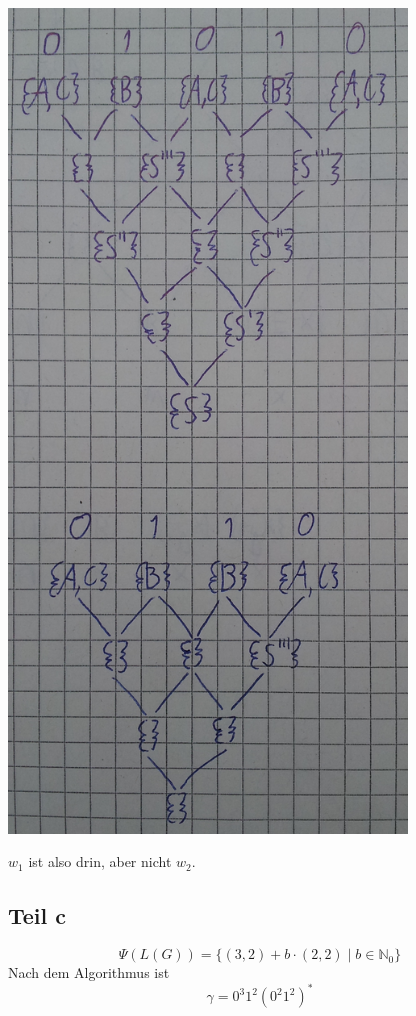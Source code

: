 \documentclass[10pt,a4paper]{article}
\begin{document}
\includegraphics[width=300pt]{7_4_b.png}

$w_{1}$ ist also drin, aber nicht $w_{2}$.

\subsection{Teil c}

\begin{equation}
  \Psi(L(G)) = \{ (3, 2) + b \cdot (2, 2) \mid b \in \mathbb{N}_{0} \}
\end{equation}
Nach dem Algorithmus ist
\begin{equation}
  \gamma = 0^{3}1^{2}(0^{2}1^{2})^{*}
\end{equation}
\end{document}
